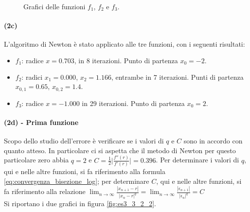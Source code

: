 \documentclass[letterpaper, 12pt]{article}
\numberwithin{equation}{section}    %
\begin{document}
\begin{figure}[!ht]
\begin{minipage}[b]{0.47\textwidth}
        \caption*{}
    \end{minipage}
    \caption{Grafici delle funzioni $f_1$, $f_2$ e $f_3$.}
    \label{fig:es3_3_2_1}
\end{figure}

\paragraph{(2c)}L'algoritmo di Newton è stato applicato alle tre funzioni, con i seguenti risultati:
\begin{itemize}
    \item $f_1$: radice $x = 0.703$, in 8 iterazioni. Punto di partenza $x_0 = -2$.
    \item $f_2$: radici $x_1 = 0.000$, $x_2 = 1.166$, entrambe in 7 iterazioni. Punti di partenza $x_{0,1} = 0.65$, $x_{0,2} = 1.4$.
    \item $f_3$: radice $x = -1.000$ in 29 iterazioni. Punto di partenza $x_0 = 2$.
\end{itemize}

\paragraph{(2d) - Prima funzione}
Scopo dello studio dell'errore è verificare se i valori di $q$ e $C$ sono in accordo con quanto atteso.
In particolare ci si aspetta che il metodo di Newton per questo particolare zero abbia $q = 2$ e 
$C = {\frac{1}{2}}\bigg|{\frac{f''(r)}{f'(r)}}\bigg| = 0.396$. Per determinare i valori di $q$, qui e nelle altre 
funzioni,
si fa riferimento alla formula \ref{eq:convergenza_bisezione_log}; per determinare $C$, qui e nelle altre funzioni,
si fa riferimento alla relazione 
$\lim_{n\to\infty} {\frac{|x_{n+1}-r|}{|x_n-r|^q}}= \lim_{n\to\infty} {\frac{|\epsilon_{n+1}|}{|\epsilon_n|^q}}=C$ \\
Si riportano i due grafici in figura \ref{fig:es3_3_2_2}.
\end{document}

